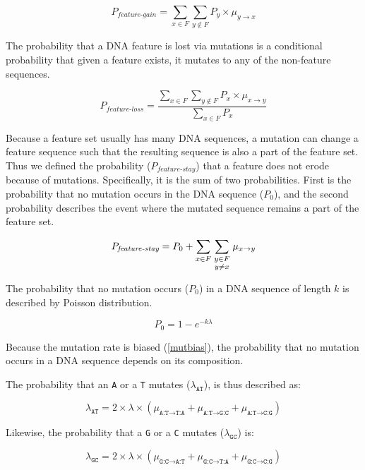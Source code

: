 \documentclass[12pt,a4paper]{article}
\begin{document}
\begin{equation}
P_\textit{feature-gain} = \sum_{x \in F} \sum_{y \notin F} P_y \times \mu_{y\to x}
\end{equation}

The probability that a DNA feature is lost via mutations is a conditional probability that given a feature exists, it mutates to any of the non-feature sequences. 

\begin{equation}
P_\textit{feature-loss} = \frac{\displaystyle\sum_{x \in F} \sum_{y \notin F} P_x \times \mu_{x\to y}}{\displaystyle\sum_{x \in F} P_x}
\end{equation}

Because a feature set usually has many DNA sequences, a mutation can change a feature sequence such that the resulting sequence is also a part of the feature set. Thus we defined the probability ($P_\textit{feature-stay}$) that a feature does not erode because of mutations. Specifically, it is the sum of two probabilities. First is the probability that no mutation occurs in the DNA sequence ($P_0$), and the second probability describes the event where the mutated sequence remains a part of the feature set.

\begin{equation}
P_\textit{feature-stay} = P_0 + \sum_{x \in F} \sum_{\genfrac{}{}{0pt}{1}{y \in F}{y\neq x}} \mu_{x\to y}
\end{equation}


The probability that no mutation occurs ($P_0$) in a DNA sequence of length $k$ is described by Poisson distribution. 

$$P_0 = 1-e^{-k\lambda}$$

Because the mutation rate is biased (\autoref{mutbias}), the probability that no mutation occurs in a DNA sequence depends on its composition. 

The probability that an \texttt{A} or a \texttt{T} mutates ($\lambda_\texttt{AT}$), is thus described as:

$$\lambda_\texttt{AT} = 2\times\lambda\times(\mu_{\texttt{A:T}\to\texttt{T:A}} + \mu_{\texttt{A:T}\to\texttt{G:C}} + \mu_{\texttt{A:T}\to\texttt{C:G}})$$

Likewise, the probability that a \texttt{G} or a \texttt{C} mutates ($\lambda_\texttt{GC}$) is: 

\vspace{-1ex}

$$\lambda_\texttt{GC} = 2\times\lambda\times(\mu_{\texttt{G:C}\to\texttt{A:T}} + \mu_{\texttt{G:C}\to\texttt{T:A}} + \mu_{\texttt{G:C}\to\texttt{C:G}})$$
\end{document}
